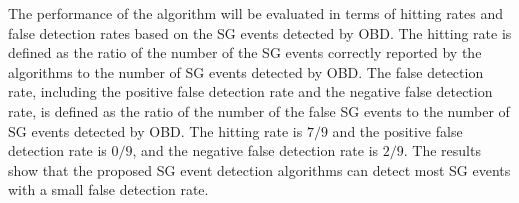 \documentclass[final,oneside,onecolumn,12pt,a4paper]{book}%
\begin{document}
The performance of the algorithm will be evaluated in terms of
hitting rates and false detection rates based on the SG events detected by
OBD.
The hitting rate is defined as the ratio of the number of the SG events
correctly reported by the algorithms to the number of SG events detected by
OBD. The false detection rate, including the positive false detection rate and
the negative false detection rate, is defined as the ratio of the number of
the false SG events to the number of SG events detected by OBD.
The hitting rate is $7/9$ and the positive false detection rate is $0/9$, and
the negative false detection rate is $2/9$. The results show that the proposed
SG event detection algorithms can detect most SG events with a small false
detection rate.
\end{document}
